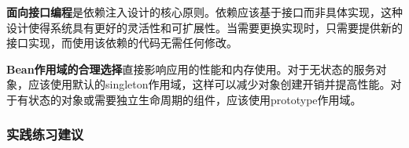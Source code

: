 \begin{Shaded}
\begin{Highlighting}[]
 \OperatorTok{;}
 \OperatorTok{(}\OperatorTok{)} \OperatorTok{\{}
     \OperatorTok{=}\OperatorTok{;}
\OperatorTok{\}}
\end{Highlighting}
\end{Shaded}

\textbf{面向接口编程}是依赖注入设计的核心原则。依赖应该基于接口而非具体实现，这种设计使得系统具有更好的灵活性和可扩展性。当需要更换实现时，只需要提供新的接口实现，而使用该依赖的代码无需任何修改。

\begin{Shaded}
\begin{Highlighting}[]
 \OperatorTok{;}

 \OperatorTok{;}
\end{Highlighting}
\end{Shaded}

\textbf{Bean作用域的合理选择}直接影响应用的性能和内存使用。对于无状态的服务对象，应该使用默认的singleton作用域，这样可以减少对象创建开销并提高性能。对于有状态的对象或需要独立生命周期的组件，应该使用prototype作用域。

\begin{Shaded}
\begin{Highlighting}[]
  
 \OperatorTok{\{} \OperatorTok{\}}

\OperatorTok{(}\OperatorTok{)}  
 \OperatorTok{\{} \OperatorTok{\}}
\end{Highlighting}
\end{Shaded}

\subsubsection{实践练习建议}\label{ux5b9eux8df5ux7ec3ux4e60ux5efaux8bae-1}

